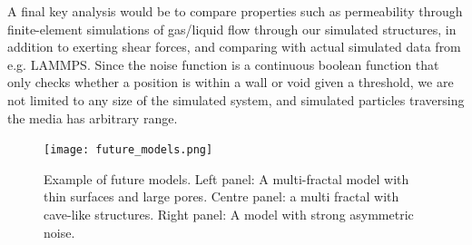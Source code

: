 \documentclass[aps,pre,twocolumn,letterpaper,floatfix,showpacs]{revtex4}
\begin{document}
A final key analysis would be to compare properties such as permeability through finite-element simulations of gas/liquid flow through our simulated structures, in addition to exerting shear forces, and comparing with actual simulated data from e.g. LAMMPS. 
Since the noise function is a continuous boolean function that only checks whether a position is within a wall or void given a threshold, we are not limited to any size of the simulated system, and simulated particles traversing the media has arbitrary range.  



\begin{figure}
\texttt{[image: future\_models.png]}
\caption{Example of future models. Left panel: A multi-fractal model with thin surfaces and large pores. Centre panel: a multi fractal with cave-like structures. Right panel: A model with strong asymmetric noise. }
\label{fig:future_models}
\end{figure}


\end{document}
